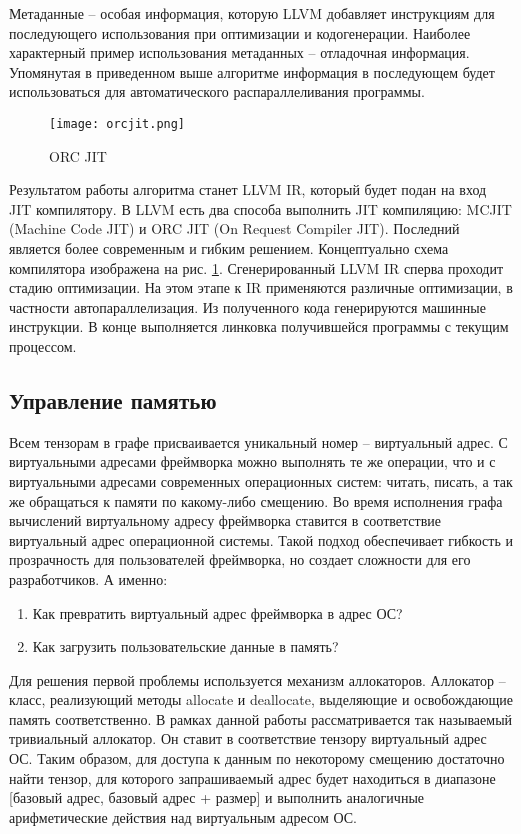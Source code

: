 Метаданные -- особая информация, которую LLVM добавляет инструкциям для
последующего использования при оптимизации и кодогенерации. Наиболее характерный
пример использования метаданных -- отладочная информация. Упомянутая в приведенном
выше алгоритме информация в последующем будет использоваться для автоматического
распараллеливания программы.

\begin{figure}[h]
    \centering
    \texttt{[image: orcjit.png]}
    \caption{ORC JIT}
    \label{fig:orcjit}
\end{figure}

Результатом работы алгоритма станет LLVM IR, который будет подан на вход
JIT компилятору. В LLVM есть два способа выполнить JIT компиляцию: MCJIT
(Machine Code JIT) и ORC JIT (On Request Compiler JIT). Последний является
более современным и гибким решением. Концептуально схема компилятора
изображена на рис. \ref{fig:orcjit}. Сгенерированный LLVM IR сперва проходит
стадию оптимизации. На этом этапе к IR применяются различные оптимизации, в
частности автопараллелизация. Из полученного кода генерируются машинные инструкции.
В конце выполняется линковка получившейся программы с текущим процессом.

\subsection{Управление памятью}

Всем тензорам в графе присваивается уникальный номер -- виртуальный адрес.
С виртуальными адресами фреймворка можно выполнять те же операции, что и с
виртуальными адресами современных операционных систем: читать, писать, а так
же обращаться к памяти по какому-либо смещению. Во время исполнения графа
вычислений виртуальному адресу фреймворка ставится в соответствие виртуальный
адрес операционной системы. Такой подход обеспечивает гибкость и прозрачность
для пользователей фреймворка, но создает сложности для его разработчиков.
А именно:
\begin{enumerate}
    \item Как превратить виртуальный адрес фреймворка в адрес ОС?
    \item Как загрузить пользовательские данные в память?
\end{enumerate}

Для решения первой проблемы используется механизм аллокаторов. Аллокатор --
класс, реализующий методы allocate и deallocate, выделяющие и освобождающие
память соответственно. В рамках данной работы рассматривается так называемый
тривиальный аллокатор. Он ставит в соответствие тензору виртуальный адрес ОС.
Таким образом, для доступа к данным по некоторому смещению достаточно найти
тензор, для которого запрашиваемый адрес будет находиться в диапазоне [базовый адрес, базовый адрес + размер]
и выполнить аналогичные арифметические действия над виртуальным адресом ОС.

